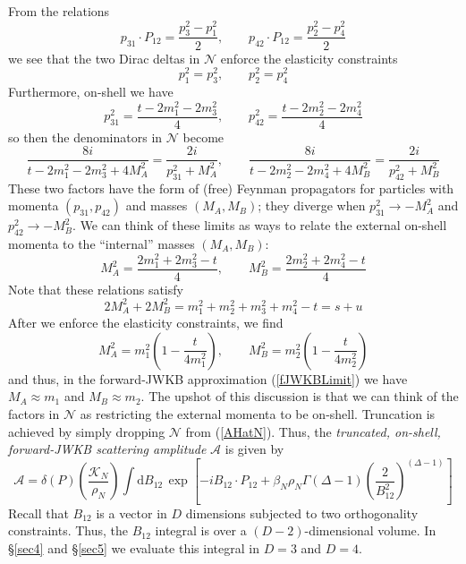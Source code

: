From the relations
\begin{equation}
	p_{31} \cdot P_{12} = \frac{p_{3}^{2} - p_{1}^{2}}{2}, \qquad p_{42} \cdot P_{12} = \frac{p_{2}^{2} - p_{4}^{2}}{2}
\end{equation}
we see that the two Dirac deltas in $\mathcal{N}$ enforce the elasticity constraints
\begin{equation}
	p_{1}^{2} = p_{3}^{2}, \qquad p_{2}^{2} = p_{4}^{2}
\end{equation}
Furthermore, on-shell we have
\begin{equation}
	p_{31}^{2} = \frac{t - 2 m_{1}^{2} - 2m_{3}^{2}}{4}, \qquad p_{42}^{2} = \frac{t - 2 m_{2}^{2} - 2m_{4}^{2}}{4}
\end{equation}
so then the denominators in $\mathcal{N}$ become
\begin{equation}
	\frac{8i}{t - 2m_{1}^{2} - 2m_{3}^{2} + 4 M_{A}^{2}} = \frac{2i}{p_{31}^{2} + M_{A}^{2}}, \qquad \frac{8i}{t - 2m_{2}^{2} - 2m_{4}^{2} + 4 M_{B}^{2}} = \frac{2i}{p_{42}^{2} + M_{B}^{2}}
\end{equation}
These two factors have the form of (free) Feynman propagators for particles with momenta $(p_{31}, p_{42})$ and masses $(M_{A}, M_{B})$; they diverge when $p_{31}^{2} \rightarrow -M_{A}^{2}$ and $p_{42}^{2} \rightarrow -M_{B}^{2}$. We can think of these limits as ways to relate the external on-shell momenta to the ``internal'' masses $(M_{A}, M_{B})$:
\begin{equation}
	M_{A}^{2} = \frac{2m_{1}^{2} + 2m_{3}^{2} - t}{4}, \qquad M_{B}^{2} = \frac{2m_{2}^{2} + 2m_{4}^{2} - t}{4}
\end{equation}
Note that these relations satisfy
\begin{equation}
	2M_{A}^{2} + 2M_{B}^{2} = m_{1}^{2} + m_{2}^{2} + m_{3}^{2} + m_{4}^{2} - t = s + u
\end{equation}
After we enforce the elasticity constraints, we find
\begin{equation}
	M_{A}^{2} = m_{1}^{2} \left( 1 - \frac{t}{4 m_{1}^{2}} \right), \qquad M_{B}^{2} = m_{2}^{2} \left( 1 - \frac{t}{4 m_{2}^{2}} \right)
\end{equation}
and thus, in the forward-JWKB approximation (\ref{fJWKBLimit}) we have $M_{A} \approx m_{1}$ and $M_{B} \approx m_{2}$. The upshot of this discussion is that we can think of the factors in $\mathcal{N}$ as restricting the external momenta to be on-shell. Truncation is achieved by simply dropping $\mathcal{N}$ from (\ref{AHatN}). Thus, the \textit{truncated, on-shell, forward-JWKB scattering amplitude} $\mathcal{A}$ is given by
\begin{equation}
	\mathcal{A} = \delta(P) \left( \frac{\mathcal{K}_{N}}{\rho_{N}} \right) \int \mathrm{d}B_{12} \, \exp{\left[-i B_{12} \cdot P_{12} + \beta_{N} \rho_{N} \Gamma(\Delta - 1) \left( \frac{2}{B_{1 2}^{2}} \right)^{(\Delta - 1)} \right]} \label{AHND}
\end{equation}
Recall that $B_{12}$ is a vector in $D$ dimensions subjected to two orthogonality constraints. Thus, the $B_{12}$ integral is over a $(D-2)$-dimensional volume. In \S\ref{sec4} and \S\ref{sec5} we evaluate this integral in $D = 3$ and $D = 4$.